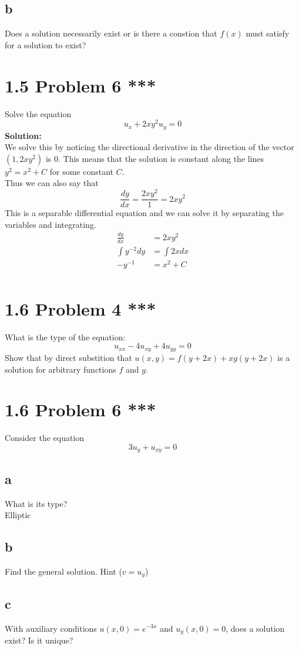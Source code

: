 \documentclass{article}
\begin{document}
\subsection*{b} Does a solution necessarily exist or is there a constion that $f(x)$ must satisfy for a solution to exist?\\

\section*{1.5 Problem 6 ***}
Solve the equation 
$$ u_x + 2xy^2 u_y = 0$$
\textbf{Solution: }\\
We solve this by noticing the directional derivative in the direction of the vector $(1, 2xy^2)$ is 0. This means that the solution is constant along the lines $y^2 = x^2 + C$ for some constant $C$.\\
Thus we can also say that 
$$ \frac{dy}{dx} = \frac{2xy^2}{1} = 2xy^2$$
This is a separable differential equation and we can solve it by separating the variables and integrating.\\
\begin{align*}
    \frac{dy}{dx} &= 2xy^2\\
    \int y^{-2} dy &= \int 2x dx\\
    -y^{-1} &= x^2 + C\\
\end{align*}


\section*{1.6 Problem 4 ***}
What is the type of the equation:
$$ u_{xx} - 4u_{xy} + 4u_{yy} = 0$$
Show that by direct substition that $u(x,y) = f(y+2x) + xg(y+2x)$ is a solution for arbitrary functions $f$ and $g$. 

\section*{1.6 Problem 6 ***}
Consider the equation
$$ 3u_y + u_{xy} = 0$$
\subsection*{a}
What is its type?\\
Elliptic

\subsection*{b}
Find the general solution. Hint ($v = u_y$)\\

\subsection*{c}
With auxiliary conditions $u(x,0) = e^{-3x}$ and $u_y(x,0) = 0$, does a solution exist? Is it unique?\\
\end{document}
